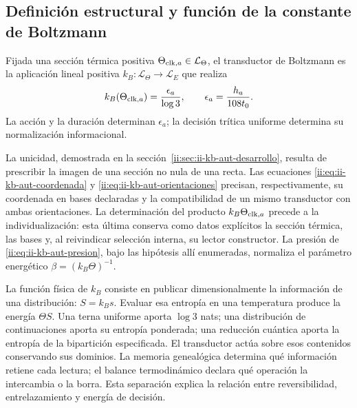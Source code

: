 \subsection{Definición estructural y función de la constante de Boltzmann}
\label{ii:sec:ii-definicion-boltzmann}

\begin{definition}
Fijada una sección térmica positiva
\(\Theta_{{\rm clk},a}\in\mathcal L_\Theta\), el transductor
de Boltzmann es la aplicación lineal positiva
\(k_B:\mathcal L_\Theta\to\mathcal L_E\) que realiza
\begin{equation}
 k_B(\Theta_{{\rm clk},a})
 =\frac{\epsilon_a}{\log3},
 \qquad \epsilon_a=\frac{h_a}{108t_0}.
 \label{ii:eq:ii-definicion-boltzmann-transductor}
\end{equation}
La acción y la duración determinan \(\epsilon_a\); la decisión
trítica uniforme determina su normalización informacional.
\end{definition}

La unicidad, demostrada en la sección~\ref{ii:sec:ii-kb-aut-desarrollo},
resulta de prescribir la imagen de una sección no nula de una recta.
Las ecuaciones \eqref{ii:eq:ii-kb-aut-coordenada} y
\eqref{ii:eq:ii-kb-aut-orientaciones} precisan, respectivamente, su
coordenada en bases declaradas y la compatibilidad de un mismo
transductor con ambas orientaciones. La determinación del producto
\(k_B\Theta_{{\rm clk},a}\) precede a la individualización:
esta última conserva como datos explícitos la sección térmica, las
bases y, al reivindicar selección interna, su lector constructor.
La presión de \eqref{ii:eq:ii-kb-aut-presion}, bajo las hipótesis
allí enumeradas, normaliza el parámetro energético
\(\beta=(k_B\Theta)^{-1}\).

La función física de \(k_B\) consiste en publicar dimensionalmente
la información de una distribución: \(S=k_Bs\). Evaluar esa
entropía en una temperatura produce la energía \(\Theta S\).
Una terna uniforme aporta \(\log3\) nats; una distribución de
continuaciones aporta su entropía ponderada; una reducción cuántica
aporta la entropía de la bipartición especificada. El transductor
actúa sobre esos contenidos conservando sus dominios. La memoria
genealógica determina qué información retiene cada lectura; el
balance termodinámico declara qué operación la intercambia o la
borra. Esta separación explica la relación entre reversibilidad,
entrelazamiento y energía de decisión.
